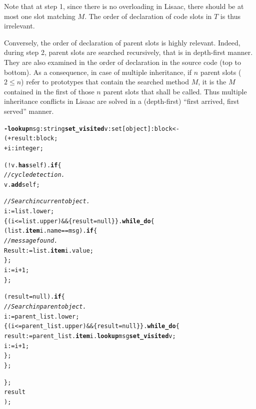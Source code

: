 \documentclass[11pt]{mybook}
\begin{document}
Note that at step 1,  since there is no overloading in Lisaac, there
should be at most one slot matching $M$.
The order of declaration of code slots in $T$ is thus irrelevant.

Conversely, the order of declaration of parent slots is highly 
relevant. 
Indeed, during step 2, parent slots are searched recursively, that is in
depth-first manner.  
They are also examined in the order of declaration in the source code
(top to bottom).
As a consequence, in case of multiple inheritance, if $n$ parent slots
($ 2 \le n$) refer to prototypes that contain the searched method $M$,
it is the $M$ contained in the first of those $n$ parent slots that
shall be called.
Thus multiple inheritance conflicts in Lisaac are solved in a
(depth-first) ``first arrived, first served'' manner.

\begin{alltt}
  {\bf{}- lookup} msg:{\sc{}string} {\bf{}set\_visited} v:{\sc{}set}[{\sc{}object}] :{\sc{}block} <-
    ( + result:{\sc{}block};
      + i:{\sc{}integer};
     
      (! v.{\bf{}has} self).{\bf{}if} \{   
        {\it{}// cycle detection.}
        v.{\bf{}add} self;

        {\it{}// Search in current object.} 
        i := list.lower;
        \{(i <= list.upper) && \{result = {\sc{}null}\}\}.{\bf{}while\_do} \{
          (list.{\bf{}item} i.name == msg).{\bf{}if} \{   
            {\it{}// message found.}
            Result := list.{\bf{}item} i.value;
          \};
          i := i + 1;
        \};

        (result = {\sc{}null}).{\bf{}if} \{
          {\it{}// Search in parent object.}
          i := parent\_list.lower;
          \{(i <= parent\_list.upper) && \{result = {\sc{}null}\}\}.{\bf{}while\_do} \{
            result := parent\_list.{\bf{}item} i.{\bf{}lookup} msg {\bf{}set\_visited} v;
            i := i + 1;
          \};
        \};

      \};
      result 
    );

\end{alltt}

\end{document}
